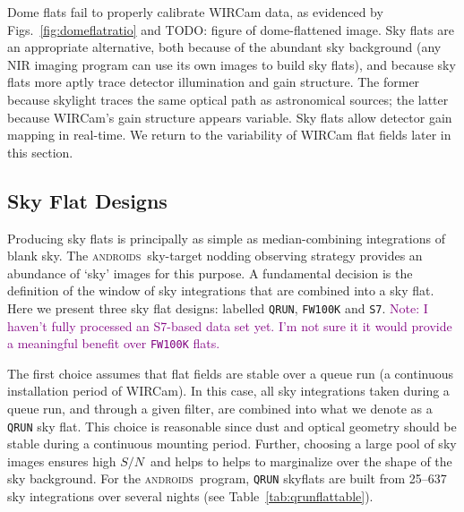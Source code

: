 \documentclass[iop]{emulateapj}
\newcommand{\sn}{\ensuremath{S/N}} %
\newcommand{\androids}{\textsc{androids}}
\newcommand{\todo}[1]{\textcolor{RedOrange}{#1}} %
\newcommand{\comment}[1]{\textcolor{purple}{#1}} %
\newcommand{\Tab}[1]{Table~\ref{tab:#1}}  %
\begin{document}
Dome flats fail to properly calibrate WIRCam data, as evidenced by Figs.~\ref{fig:domeflatratio} and \todo{TODO: figure of dome-flattened image}.
Sky flats are an appropriate alternative, both because of the abundant sky background (any NIR imaging program can use its own images to build sky flats), and because sky flats more aptly trace detector illumination and gain structure.
The former because skylight traces the same optical path as astronomical sources; the latter because WIRCam's gain structure appears variable.
Sky flats allow detector gain mapping in real-time.
We return to the variability of WIRCam flat fields later in this section.

\subsection{Sky Flat Designs}
\label{sec:flatdesign}

Producing sky flats is principally as simple as median-combining integrations of blank sky. 
The \androids\ sky-target nodding observing strategy provides an abundance of `sky' images for this purpose.
A fundamental decision is the definition of the window of sky integrations that are combined into a sky flat.
Here we present three sky flat designs: labelled \texttt{QRUN}, \texttt{FW100K} and \texttt{S7}.
\comment{Note: I haven't fully processed an S7-based data set yet. I'm not sure it it would provide a meaningful benefit over \texttt{FW100K} flats.}

The first choice assumes that flat fields are stable over a queue run (a continuous installation period of WIRCam).
In this case, all sky integrations taken during a queue run, and through a given filter, are combined into what we denote as a \texttt{QRUN} sky flat.
This choice is reasonable since dust and optical geometry should be stable during a continuous mounting period.
Further, choosing a large pool of sky images ensures high \sn\, and helps to helps to marginalize over the shape of the sky background.
For the \androids\ program, \texttt{QRUN} skyflats are built from 25--637 sky integrations over several nights (see \Tab{qrunflattable}).
\end{document}
